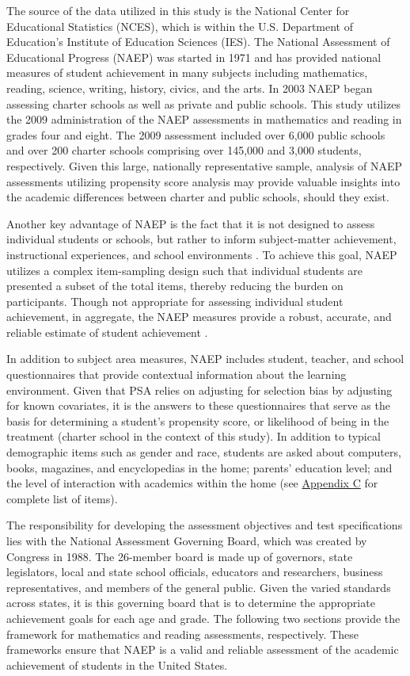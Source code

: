 \documentclass[letterpaper,12p,twoside]{article} %
\begin{document}
The source of the data utilized in this study is the National Center for Educational Statistics (NCES), which is within the U.S. Department of Education's Institute of Education Sciences (IES). The National Assessment of Educational Progress (NAEP) was started in 1971 and has provided national measures of student achievement in many subjects including mathematics, reading, science, writing, history, civics, and the arts. In 2003 NAEP began assessing charter schools as well as private and public schools. This study utilizes the 2009 administration of the NAEP assessments in mathematics and reading in grades four and eight. The 2009 assessment included over 6,000 public schools and over 200 charter schools comprising over 145,000 and 3,000 students, respectively. Given this large, nationally representative sample, analysis of NAEP assessments utilizing propensity score analysis may provide valuable insights into the academic differences between charter and public schools, should they exist.

Another key advantage of NAEP is the fact that it is not designed to assess individual students or schools, but rather to inform subject-matter achievement, instructional experiences, and school environments \cite{BraunJenkinsGrigg2006}. To achieve this goal, NAEP utilizes a complex item-sampling design such that individual students are presented a subset of the total items, thereby reducing the burden on participants. Though not appropriate for assessing individual student achievement, in aggregate, the NAEP measures provide a robust, accurate, and reliable estimate of student achievement \cite{DeptOfEd2009}.

In addition to subject area measures, NAEP includes student, teacher, and school questionnaires that provide contextual information about the learning environment. Given that PSA relies on adjusting for selection bias by adjusting for known covariates, it is the answers to these questionnaires that serve as the basis for determining a student's propensity score, or likelihood of being in the treatment (charter school in the context of this study). In addition to typical demographic items such as gender and race, students are asked about computers, books, magazines, and encyclopedias in the home; parents' education level; and the level of interaction with academics within the home (see \hyperref[appendixC]{Appendix C} for complete list of items).

The responsibility for developing the assessment objectives and test specifications lies with the National Assessment Governing Board, which was created by Congress in 1988. The 26-member board is made up of governors, state legislators, local and state school officials, educators and researchers, business representatives, and members of the general public. Given the varied standards across states, it is this governing board that is to determine the appropriate achievement goals for each age and grade. The following two sections provide the framework for mathematics and reading assessments, respectively. These frameworks ensure that NAEP is a valid and reliable assessment of the academic achievement of students in the United States.
\end{document}
